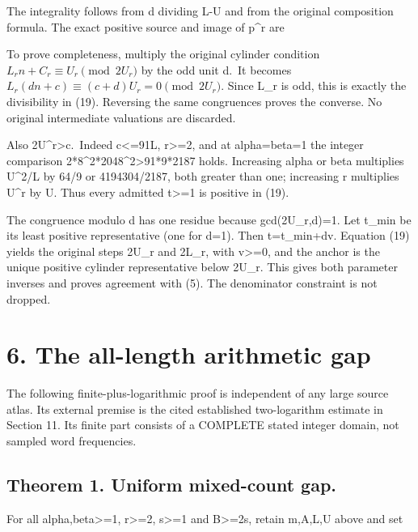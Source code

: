 The integrality follows from d dividing L-U and from the original
composition formula. The exact positive source and image of p\^{}r are


To prove completeness, multiply the original cylinder condition
\(L_rn+C_r\equiv U_r\pmod{2U_r}\) by the odd unit d.~It becomes
\(L_r(dn+c)\equiv(c+d)U_r=0\pmod{2U_r}\). Since L\_r is odd, this is
exactly the divisibility in (19). Reversing the same congruences proves
the converse. No original intermediate valuations are discarded.

Also 2U\^{}r\textgreater c.~Indeed c\textless=91L, r\textgreater=2, and
at alpha=beta=1 the integer comparison
2*8\^{}2*2048\^{}2\textgreater91*9*2187 holds. Increasing alpha or beta
multiplies U\^{}2/L by 64/9 or 4194304/2187, both greater than one;
increasing r multiplies U\^{}r by U. Thus every admitted t\textgreater=1
is positive in (19).

The congruence modulo d has one residue because gcd(2U\_r,d)=1. Let
t\_min be its least positive representative (one for d=1). Then
t=t\_min+dv. Equation (19) yields the original steps 2U\_r and 2L\_r,
with v\textgreater=0, and the anchor is the unique positive cylinder
representative below 2U\_r. This gives both parameter inverses and
proves agreement with (5). The denominator constraint is not dropped.

\section{6. The all-length arithmetic gap}

The following finite-plus-logarithmic proof is independent of any large
source atlas. Its external premise is the cited established
two-logarithm estimate in Section 11. Its finite part consists of a
COMPLETE stated integer domain, not sampled word frequencies.

\subsection{Theorem 1. Uniform mixed-count gap.}

For all alpha,beta\textgreater=1, r\textgreater=2, s\textgreater=1 and
B\textgreater=2s, retain m,A,L,U above and set


